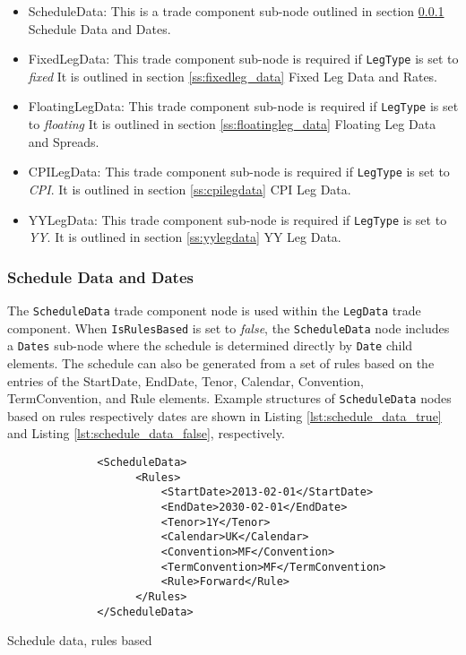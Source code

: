 \begin{itemize}
\item ScheduleData: This is a trade component sub-node outlined in section \ref{ss:schedule_data} Schedule Data and
Dates.
\item FixedLegData: This trade component sub-node is required if \lstinline!LegType! is set to \emph{fixed} It is
outlined in section \ref{ss:fixedleg_data} Fixed Leg Data and Rates.
\item FloatingLegData: This trade component sub-node is required if \lstinline!LegType! is set to \emph{floating} It is
outlined in section \ref{ss:floatingleg_data} Floating Leg Data and Spreads.
\item CPILegData: This trade component sub-node is required if \lstinline!LegType! is set to \emph{CPI}. It is
  outlined in section \ref{ss:cpilegdata} CPI Leg Data.
\item YYLegData: This trade component sub-node is required if \lstinline!LegType! is set to \emph{YY}. It is
  outlined in section \ref{ss:yylegdata} YY Leg Data.
\end{itemize}

\subsubsection{Schedule Data and Dates}\label{ss:schedule_data}

The \lstinline!ScheduleData! trade component node is used within the \lstinline!LegData! trade component. When
\lstinline!IsRulesBased! is set to \emph{false}, the \lstinline!ScheduleData! node includes a \lstinline!Dates! sub-node
where the schedule is determined directly by \lstinline!Date! child elements. The schedule can also be generated from a
set of rules based on the entries of the StartDate, EndDate, Tenor, Calendar, Convention, TermConvention, and Rule
elements.  Example structures of \lstinline!ScheduleData! nodes based on rules respectively dates are shown in Listing
\ref{lst:schedule_data_true} and Listing \ref{lst:schedule_data_false}, respectively.

\begin{listing}[H]
\begin{verbatim}
              <ScheduleData>
                    <Rules>
                        <StartDate>2013-02-01</StartDate>
                        <EndDate>2030-02-01</EndDate>
                        <Tenor>1Y</Tenor>
                        <Calendar>UK</Calendar>
                        <Convention>MF</Convention>
                        <TermConvention>MF</TermConvention>
                        <Rule>Forward</Rule>
                    </Rules>
              </ScheduleData>
\end{verbatim}
\caption{Schedule data, rules based}
\label{lst:schedule_data_true}
\end{listing}

